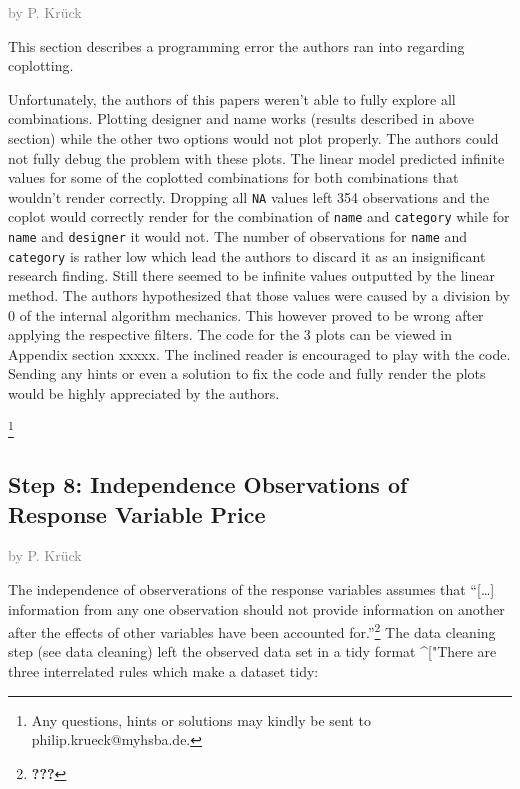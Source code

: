 \documentclass[a4paper, nobind]{templates/ociamthesis}
\begin{document}
\textcolor{gray}{by P. Krück}

This section describes a programming error the authors ran into regarding coplotting.

Unfortunately, the authors of this papers weren't able to fully explore all combinations.
Plotting designer and name works (results described in above section) while the other two options would not plot properly.
The authors could not fully debug the problem with these plots.
The linear model predicted infinite values for some of the coplotted combinations for both combinations that wouldn't render correctly.
Dropping all \texttt{NA} values left 354 observations and the coplot would correctly render for the combination of \texttt{name} and \texttt{category} while for \texttt{name} and \texttt{designer} it would not. The number of observations for \texttt{name} and \texttt{category} is rather low which lead the authors to discard it as an insignificant research finding.
Still there seemed to be infinite values outputted by the linear method. The authors hypothesized that those values were caused by a division by 0 of the internal algorithm mechanics. This however proved to be wrong after applying the respective filters.
The code for the 3 plots can be viewed in Appendix section xxxxx.
The inclined reader is encouraged to play with the code. Sending any hints or even a solution to fix the code and fully render the plots would be highly appreciated by the authors.

\footnote{Any questions, hints or solutions may kindly be sent to philip.krueck@myhsba.de.}

\hypertarget{step-8-independence-observations-of-response-variable-price}{%
\subsection{Step 8: Independence Observations of Response Variable Price}\label{step-8-independence-observations-of-response-variable-price}}

\textcolor{gray}{by P. Krück}

The independence of observerations of the response variables assumes that ``{[}\ldots{}{]} information from any one observation should not provide information on another after the effects of other variables have been accounted for.''\footnote{{\textbf{???}}}
The data cleaning step (see data cleaning) left the observed data set in a tidy format \^{}{[}"There are three interrelated rules which make a dataset tidy:
\end{document}
